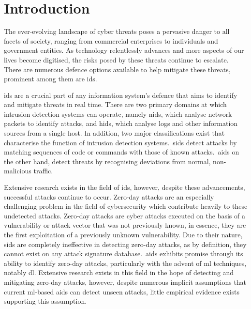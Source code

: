\chapter{Introduction}%
\label{chp:introduction}

The ever-evolving landscape of cyber threats poses a pervasive danger to all
facets of society, ranging from commercial enterprises to individuals and
government entities. As technology relentlessly advances and more aspects of
our lives become digitised, the risks posed by these threats continue to
escalate. There are numerous defence options available to help mitigate these
threats, prominent among them are \gls{ids}.

\gls{ids} are a crucial part of
any information system's defence that aims to identify and mitigate threats in
real time. There are two primary domains at which intrusion detection systems
can operate, namely \gls{nids}, which analyse network packets to identify
attacks, and \gls{hids}, which analyse logs and other information sources from
a single host. In addition, two major classifications exist that characterise
the function of intrusion detection systems.\ \gls{sids} detect attacks by
matching sequences of code or commands with those of known attacks.\ \gls{aids}
on the other hand, detect threats by recognising deviations from normal,
non-malicious traffic.

Extensive research exists in the field of \gls{ids}, however, despite these
advancements, successful attacks continue to occur. Zero-day attacks are an
especially challenging problem in the field of cybersecurity which contribute
heavily to these undetected attacks. Zero-day attacks are cyber attacks
executed on the basis of a vulnerability or attack vector that was not
previously known, in essence, they are the first exploitation of a previously
unknown vulnerability. Due to their nature, \gls{sids} are completely
ineffective in detecting zero-day attacks, as by definition, they cannot exist
on any attack signature database.\ \gls{aids} exhibits promise through its
ability to identify zero-day attacks, particularly with the advent of \gls{ml}
techniques, notably \gls{dl}. Extensive research exists in this field in
the hope of detecting and mitigating zero-day attacks, however, despite
numerous implicit assumptions that current \gls{ml}-based \gls{aids}
can detect unseen attacks, little empirical evidence exists supporting this
assumption.
